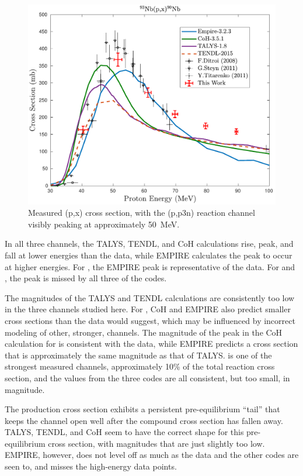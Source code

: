 \documentclass[3p]{elsarticle}
\begin{document}
\begin{figure}
 \centering
 \includegraphics[width=0.5\linewidth]{./figures/90Nb.pdf}
 \caption{Measured (p,x) cross section, with the (p,p3n) reaction channel visibly peaking at approximately \mbox{50 MeV}.}
 \label{fig:90Nb}
\end{figure}




In all three channels, the TALYS, TENDL, and CoH calculations rise, peak, and fall at lower energies than the data, while EMPIRE calculates the peak to occur at higher energies.
For , the EMPIRE peak is representative of the data.
For  and , the peak is missed by all three  of the codes.


The magnitudes of the TALYS and TENDL calculations are consistently too low in the three channels studied here. 
For , CoH and EMPIRE also predict smaller cross sections than the data would suggest, which may be influenced by incorrect modeling of other, stronger, channels.
The magnitude of the peak in the CoH calculation for   is consistent  with the data, while EMPIRE predicts a cross section that is approximately the same magnitude as that of TALYS.
 is one of the strongest measured channels, approximately 10\% of the total reaction cross section, and the values from the three codes are all consistent, but  too small, in magnitude.

The  production cross section exhibits a persistent pre-equilibrium \enquote{tail} that keeps the channel open  well after the compound cross section has fallen away. 
TALYS, TENDL, and CoH seem to have the correct shape for this pre-equilibrium cross section, with magnitudes that are just slightly too low.
EMPIRE, however, does not level off  as much as the data and the other codes are seen to, and misses the high-energy data points.
\end{document}
